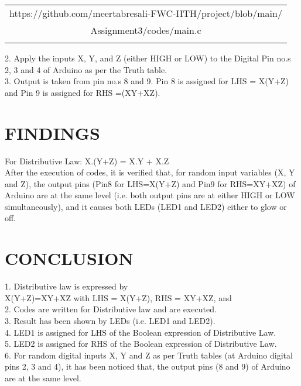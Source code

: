 \documentclass[conference]{IEEEtran}
\begin{document}
\begin{table}[h]
\centering
\begin{tabular}{| c |} \hline
\rule{0pt}{20pt} 
https://github.com/meertabresali-FWC-IITH/project/blob/main/ \\
Assignment3/codes/main.c\\
\\\hline
 \end{tabular}
\end{table}
\begin{flushleft}
2. Apply the inputs X, Y, and Z (either HIGH or LOW) to the Digital Pin no.s 2, 3 and 4 of Arduino as per the Truth table.\\
\vspace{0.4cm}
3. Output is taken from pin no.s 8 and 9. Pin 8 is assigned for LHS = X(Y+Z) and Pin 9 is assigned for RHS =(XY+XZ). 
\end{flushleft}

\section{FINDINGS}
\begin{flushleft}
For Distributive Law: X.(Y+Z) = X.Y + X.Z \\
\vspace{0.3cm}
After the execution of codes, it is verified that, for random input variables (X, Y and Z), the output pins (Pin8 for LHS=X(Y+Z) and Pin9 for RHS=XY+XZ) of Arduino are at the same level (i.e. both output pins are at either HIGH or LOW simultaneously), and it causes both LEDs (LED1 and LED2) either to glow or off.\\

\end{flushleft}
\section{CONCLUSION}
\begin{flushleft}
1. Distributive law is expressed by \\
X(Y+Z)=XY+XZ with LHS = X(Y+Z), RHS = XY+XZ, and \\
2. Codes are written for Distributive law and are executed.\\
3. Result has been shown by LEDs (i.e. LED1 and LED2). \\
4. LED1 is assigned for LHS of the Boolean expression of Distributive Law. \\
5. LED2 is assigned for RHS of the Boolean expression of Distributive Law. \\
6. For random digital inputs X, Y and Z as per Truth tables (at Arduino digital pins 2, 3 and 4), it has been noticed that, the output pins (8 and 9) of Arduino are at the same level.
\end{flushleft}
\end{document}
